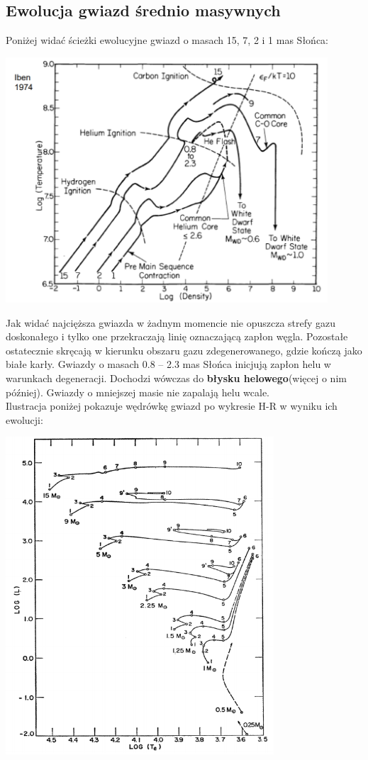 \documentclass[../index.tex]{subfiles}
\begin{document}
        \subsection{Ewolucja gwiazd średnio masywnych}
            Poniżej widać ścieżki ewolucyjne gwiazd o masach 15, 7, 2 i 1 mas Słońca:
            \begin{center}
                \includegraphics[width=12cm]{images/logRho_CT_C.png}
            \end{center}
            Jak widać najcięższa gwiazda w żadnym momencie nie opuszcza strefy gazu doskonałego i tylko one przekraczają linię oznaczającą zapłon węgla. Pozostałe ostatecznie skręcają w kierunku obszaru gazu zdegenerowanego, gdzie kończą jako białe karły. Gwiazdy o masach 0.8 – 2.3 mas Słońca inicjują zapłon helu w warunkach degeneracji. Dochodzi wówczas do \textbf{błysku helowego}(więcej o nim później). Gwiazdy o mniejszej masie nie zapalają helu wcale.\\
            Ilustracja poniżej pokazuje wędrówkę gwiazd po wykresie H-R w wyniku ich ewolucji:
            \begin{center}
                \includegraphics[width=10cm]{images/ewolucjaGwiazdHRII.png}
            \end{center}
\end{document}
